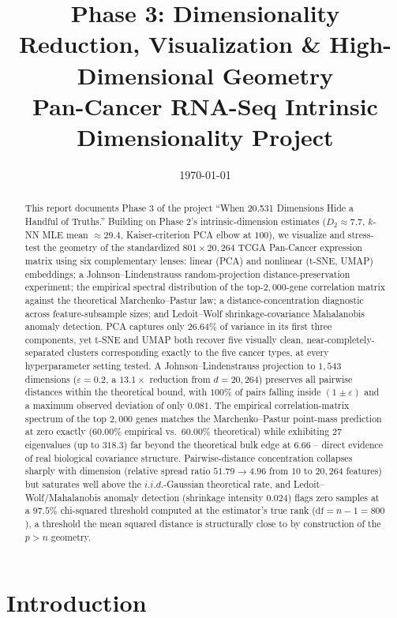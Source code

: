 \documentclass[11pt]{article}
\title{Phase 3: Dimensionality Reduction, Visualization \& High-Dimensional Geometry \\
\large Pan-Cancer RNA-Seq Intrinsic Dimensionality Project}
\author{}
\date{\today}
\begin{document}
\maketitle

\begin{abstract}
This report documents Phase 3 of the project ``When 20,531 Dimensions Hide a
Handful of Truths.'' Building on Phase 2's intrinsic-dimension estimates
($D_2 \approx 7.7$, $k$-NN MLE mean $\approx 29.4$, Kaiser-criterion PCA
elbow at $100$), we visualize and stress-test the geometry of the
standardized $801 \times 20{,}264$ TCGA Pan-Cancer expression matrix using
six complementary lenses: linear (PCA) and nonlinear (t-SNE, UMAP)
embeddings; a Johnson--Lindenstrauss random-projection distance-preservation
experiment; the empirical spectral distribution of the top-$2{,}000$-gene
correlation matrix against the theoretical Marchenko--Pastur law; a
distance-concentration diagnostic across feature-subsample sizes; and
Ledoit--Wolf shrinkage-covariance Mahalanobis anomaly detection. PCA
captures only $26.64\%$ of variance in its first three components, yet
t-SNE and UMAP both recover five visually clean, near-completely-separated
clusters corresponding exactly to the five cancer types, at every
hyperparameter setting tested. A Johnson--Lindenstrauss projection to
$1{,}543$ dimensions ($\varepsilon = 0.2$, a $13.1\times$ reduction from
$d=20{,}264$) preserves all pairwise distances within the theoretical bound,
with $100\%$ of pairs falling inside $(1 \pm \varepsilon)$ and a maximum
observed deviation of only $0.081$. The empirical correlation-matrix
spectrum of the top $2{,}000$ genes matches the Marchenko--Pastur point-mass
prediction at zero exactly ($60.00\%$ empirical vs.\ $60.00\%$
theoretical) while exhibiting $27$ eigenvalues (up to $318.3$) far beyond
the theoretical bulk edge at $6.66$ -- direct evidence of real biological
covariance structure. Pairwise-distance concentration collapses sharply
with dimension (relative spread ratio $51.79 \to 4.96$ from $10$ to
$20{,}264$ features) but saturates well above the $i.i.d.$-Gaussian
theoretical rate, and Ledoit--Wolf/Mahalanobis anomaly detection (shrinkage
intensity $0.024$) flags zero samples at a $97.5\%$ chi-squared threshold
computed at the estimator's true rank ($\mathrm{df}=n-1=800$), a threshold
the mean squared distance is structurally close to by construction of the
$p>n$ geometry.
\end{abstract}

\section{Introduction}
\end{document}
